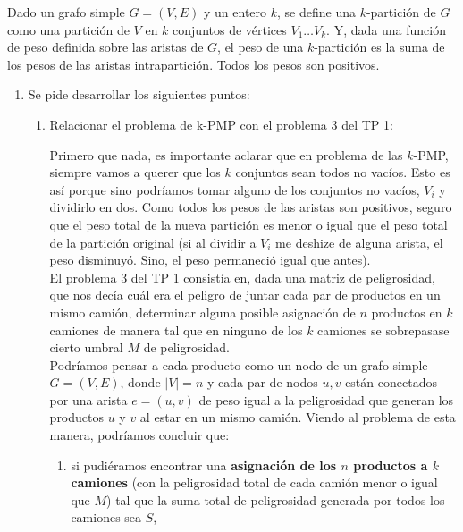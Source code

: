 \documentclass[11pt, a4paper, twoside]{article}
\begin{document}


Dado un grafo simple $G = (V,E)$ y un entero $k$, se define una $k$-partición de $G$ como
una partición de $V$ en $k$ conjuntos de vértices $V_{1} \dots V_{k}$. Y, dada una función
de peso definida sobre las aristas de $G$, el peso de una $k$-partición es la suma de los pesos
de las aristas intrapartición. Todos los pesos son positivos.

\begin{enumerate}
    \item Se pide desarrollar los siguientes puntos:
    \begin{enumerate}
		\item Relacionar el problema de k-PMP con el problema 3 del TP 1: 
			  \par Primero que nada, es importante aclarar que en problema de las $k$-PMP, siempre
			  vamos a querer que los $k$ conjuntos sean todos no vacíos. Esto es así porque
			  sino podríamos tomar alguno de los conjuntos no vacíos, $V_{i}$ y dividirlo en dos.
			  Como todos los pesos de las aristas son positivos, seguro que el peso total de la nueva
			  partición es menor o igual que el peso total de la partición original (si al dividir a
			  $V_{i}$ me deshize de alguna arista, el peso disminuyó. Sino, el peso permaneció igual
			  que antes). \\
			  El problema 3 del TP 1 consistía en, dada una matriz de peligrosidad, que 
			  nos decía cuál era
			  el peligro de juntar cada par de productos en un mismo camión,  determinar alguna
			  posible asignación de $n$ productos en $k$ camiones de manera tal que en ninguno
			  de los $k$ camiones se sobrepasase cierto umbral $M$ de peligrosidad. \\
			  Podríamos pensar a cada producto como un nodo de un grafo simple $G = (V,E)$, donde 
			  $|V| = n$ y cada par de nodos $u,v$ están conectados por una arista $e = (u,v)$ de
			  peso igual a la peligrosidad que generan los productos $u$ y $v$ al estar en un
			  mismo camión. Viendo al problema de esta manera, podríamos concluir que:
			  \begin{enumerate}
			      \item si pudiéramos encontrar una \textbf{asignación de los $n$ productos a $k$ 
			      camiones} (con la peligrosidad total de cada camión menor o igual que $M$) tal
			      que la suma total de peligrosidad generada por todos los camiones sea $S$, 

\end{enumerate}
\end{enumerate}
\end{enumerate}
\end{document}
